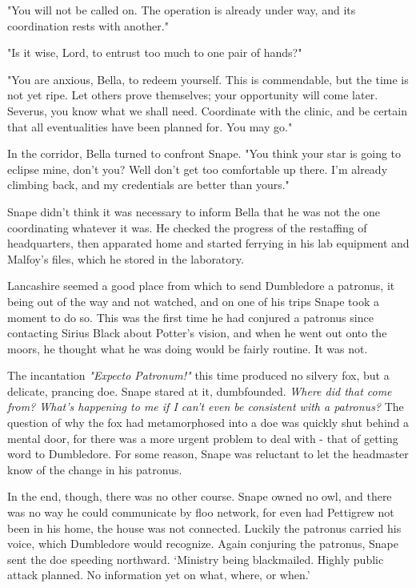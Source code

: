 \documentclass[a4paper,11pt]{article}
\begin{document}
"You will not be called on. The operation is already under way, and its coordination rests with another."

"Is it wise, Lord, to entrust too much to one pair of hands?"

"You are anxious, Bella, to redeem yourself. This is commendable, but the time is not yet ripe. Let others prove themselves; your opportunity will come later. Severus, you know what we shall need. Coordinate with the clinic, and be certain that all eventualities have been planned for. You may go."

In the corridor, Bella turned to confront Snape. "You think your star is going to eclipse mine, don't you? Well don't get too comfortable up there. I'm already climbing back, and my credentials are better than yours."

Snape didn't think it was necessary to inform Bella that he was not the one coordinating whatever it was. He checked the progress of the restaffing of headquarters, then apparated home and started ferrying in his lab equipment and Malfoy's files, which he stored in the laboratory.

Lancashire seemed a good place from which to send Dumbledore a patronus, it being out of the way and not watched, and on one of his trips Snape took a moment to do so. This was the first time he had conjured a patronus since contacting Sirius Black about Potter's vision, and when he went out onto the moors, he thought what he was doing would be fairly routine. It was not.

The incantation \emph{"Expecto Patronum!"} this time produced no silvery fox, but a delicate, prancing doe. Snape stared at it, dumbfounded. \emph{Where did that come from? What's happening to me if I can't even be consistent with a patronus?} The question of why the fox had metamorphosed into a doe was quickly shut behind a mental door, for there was a more urgent problem to deal with - that of getting word to Dumbledore. For some reason, Snape was reluctant to let the headmaster know of the change in his patronus.

In the end, though, there was no other course. Snape owned no owl, and there was no way he could communicate by floo network, for even had Pettigrew not been in his home, the house was not connected. Luckily the patronus carried his voice, which Dumbledore would recognize. Again conjuring the patronus, Snape sent the doe speeding northward. `Ministry being blackmailed. Highly public attack planned. No information yet on what, where, or when.'
\end{document}
